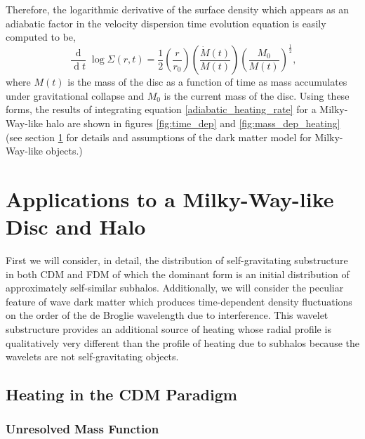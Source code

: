 \documentclass[usenatbib]{mnras}
\renewcommand{\d}[1]{\! \mathrm{d}#1 \:}
\newcommand{\deriv}[2]{\frac{\d{#1}}{\d{#2}}}
\renewcommand{\d}[1]{\ensuremath{\operatorname{d}\!{#1}}}
\begin{document}
Therefore, the logarithmic derivative of the surface density which appears as an adiabatic factor in the velocity dispersion time evolution equation is easily computed to be,
\begin{equation}
\deriv{}{t} \log{\Sigma(r,t)} = \frac{1}{2} \left( \frac{r}{r_0} \right) \left( \frac{\dot{M}(t)}{M(t)} \right) \left( \frac{M_0}{M(t)} \right)^{\frac{1}{2}},
\end{equation}
where $M(t)$ is the mass of the disc as a function of time as mass accumulates under gravitational collapse and $M_0$ is the current mass of the disc. Using these forms, the results of integrating equation \ref{adiabatic_heating_rate} for a Milky-Way-like halo are shown in figures \ref{fig:time_dep} and \ref{fig:mass_dep_heating} (see section \ref{section:application} for details and assumptions of the dark matter model for Milky-Way-like objects.)  


\section{Applications to a Milky-Way-like Disc and Halo} \label{section:application}

First we will consider, in detail, the distribution of self-gravitating substructure in both CDM and FDM of which the dominant form is an initial distribution of approximately self-similar subhalos. Additionally, we will consider the peculiar feature of wave dark matter which produces time-dependent density fluctuations on the order of the de Broglie wavelength due to interference. This wavelet substructure provides an additional source of heating {\color{magenta} whose radial profile is qualitatively very different than the profile of} heating due to subhalos because the wavelets are not self-gravitating objects. 


\subsection{Heating in the CDM Paradigm}
\subsubsection{Unresolved Mass Function}
\end{document}
